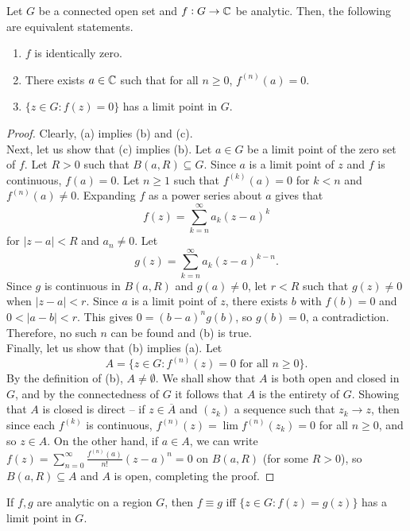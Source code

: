 	\begin{ftheo}
		\label{theo: f identically zero}
		Let $G$ be a connected open set and $f : G \to \mathbb{C}$ be analytic. Then, the following are equivalent statements.
		\begin{enumerate}[label=(\alph*)]
			\item $f$ is identically zero.
			\item There exists $a \in \mathbb{C}$ such that for all $n \ge 0$, $f^{(n)}(a) = 0$.
			\item $\{ z \in G : f(z) = 0 \}$ has a limit point in $G$.
		\end{enumerate}
	\end{ftheo}
	\begin{proof}
		Clearly, (a) implies (b) and (c).\\
		Next, let us show that (c) implies (b). Let $a \in G$ be a limit point of the zero set of $f$. Let $R > 0$ such that $B(a,R) \subseteq G$. Since $a$ is a limit point of $z$ and $f$ is continuous, $f(a) = 0$. Let $n \ge 1$ such that $f^{(k)}(a) = 0$ for $k < n$ and $f^{(n)}(a) \ne 0$. Expanding $f$ as a power series about $a$ gives that
		\[ f(z) = \sum_{k=n}^\infty a_k (z-a)^{k} \]
		for $|z-a| < R$ and $a_n \ne 0$. Let
		\[ g(z) = \sum_{k=n}^\infty a_k (z-a)^{k-n}. \]
		Since $g$ is continuous in $B(a,R)$ and $g(a) \ne 0$, let $r<R$ such that $g(z) \ne 0$ when $|z-a| < r$. Since $a$ is a limit point of $z$, there exists $b$ with $f(b) = 0$ and $0 < |a-b| < r$. This gives $0 = (b-a)^n g(b)$, so $g(b) = 0$, a contradiction. Therefore, no such $n$ can be found and (b) is true.\\
		Finally, let us show that (b) implies (a). Let
		\[ A = \{ z \in G : f^{(n)}(z) = 0 \text{ for all } n \ge 0 \}. \]
		By the definition of (b), $A \ne \emptyset$. We shall show that $A$ is both open and closed in $G$, and by the connectedness of $G$ it follows that $A$ is the entirety of $G$. Showing that $A$ is closed is direct -- if $z \in \overline{A}$ and $(z_k)$ a sequence such that $z_k \to z$, then since each $f^{(k)}$ is continuous, $f^{(n)}(z) = \lim f^{(n)}(z_k) = 0$ for all $n \ge 0$, and so $z \in A$. On the other hand, if $a \in A$, we can write $f(z) = \sum_{n = 0}^\infty \frac{f^{(n)}(a)}{n!} (z-a)^n = 0$ on $B(a,R)$ (for some $R > 0$), so $B(a,R) \subseteq A$ and $A$ is open, completing the proof.
	\end{proof}

	\begin{corollary}
		If $f,g$ are analytic on a region $G$, then $f \equiv g$ iff $\{ z \in G : f(z) = g(z) \}$ has a limit point in $G$.
	\end{corollary}

